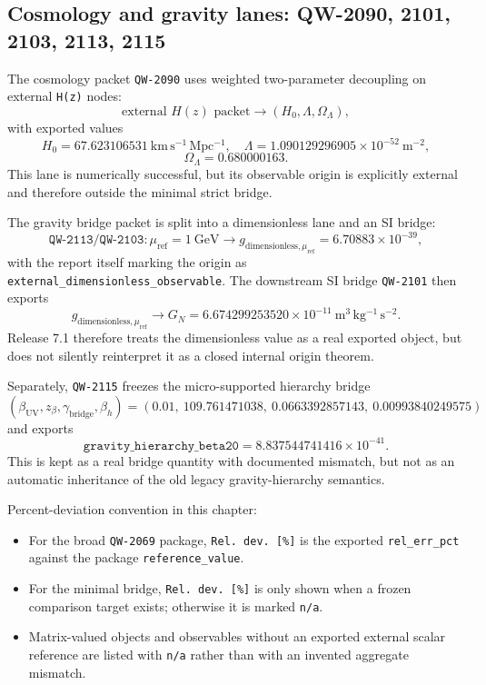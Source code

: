 \documentclass[11pt,a4paper]{article}
\begin{document}
\subsection{Cosmology and gravity lanes: QW-2090, 2101, 2103, 2113, 2115}

The cosmology packet \texttt{QW-2090} uses weighted two-parameter decoupling on
external \texttt{H(z)} nodes:
\[
\text{external }H(z)\text{ packet}
\longrightarrow
(H_0,\Lambda,\Omega_\Lambda),
\]
with exported values
\[
H_0=67.623106531\ \mathrm{km\,s^{-1}\,Mpc^{-1}},\quad
\Lambda=1.090129296905\times 10^{-52}\ \mathrm{m^{-2}},
\]
\[
\Omega_\Lambda=0.680000163.
\]
This lane is numerically successful, but its observable origin is explicitly
external and therefore outside the minimal strict bridge.

The gravity bridge packet is split into a dimensionless lane and an SI bridge:
\[
\texttt{QW-2113/QW-2103}: \mu_{\mathrm{ref}}=1\ \mathrm{GeV}
\longrightarrow
g_{\mathrm{dimensionless},\mu_{\mathrm{ref}}}=6.70883\times 10^{-39},
\]
with the report itself marking the origin as
\texttt{external\_dimensionless\_observable}. The downstream SI bridge
\texttt{QW-2101} then exports
\[
g_{\mathrm{dimensionless},\mu_{\mathrm{ref}}}
\longrightarrow
G_N = 6.674299253520\times 10^{-11}\ \mathrm{m^3\,kg^{-1}\,s^{-2}}.
\]
Release 7.1 therefore treats the dimensionless value as a real exported object,
but does not silently reinterpret it as a closed internal origin theorem.

Separately, \texttt{QW-2115} freezes the micro-supported hierarchy bridge
\[
(\beta_{\mathrm{UV}},z_\beta,\gamma_{\mathrm{bridge}},\beta_h)=
(0.01,\ 109.761471038,\ 0.0663392857143,\ 0.00993840249575)
\]
and exports
\[
\texttt{gravity\_hierarchy\_beta20}=8.837544741416\times 10^{-41}.
\]
This is kept as a real bridge quantity with documented mismatch, but not as an
automatic inheritance of the old legacy gravity-hierarchy semantics.

Percent-deviation convention in this chapter:
\begin{itemize}
  \item For the broad \texttt{QW-2069} package, \texttt{Rel. dev. [\%]} is the exported \texttt{rel\_err\_pct} against the package \texttt{reference\_value}.
  \item For the minimal bridge, \texttt{Rel. dev. [\%]} is only shown when a frozen comparison target exists; otherwise it is marked \texttt{n/a}.
  \item Matrix-valued objects and observables without an exported external scalar reference are listed with \texttt{n/a} rather than with an invented aggregate mismatch.
\end{itemize}
\end{document}
